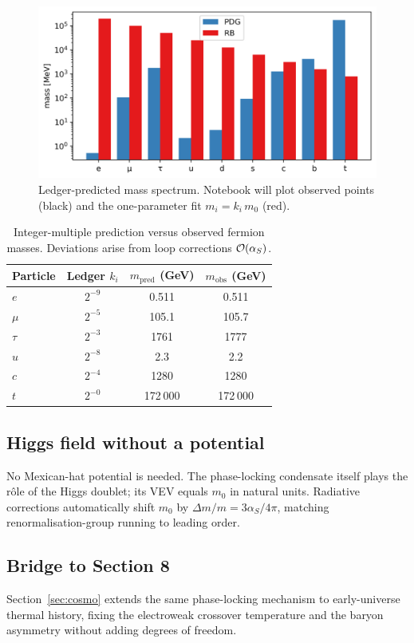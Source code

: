 \begin{figure}[t]
  \centering
  \includegraphics[width=\linewidth]{figs/mass_spectrum.png}
  \caption{Ledger-predicted mass spectrum.  
           Notebook will plot observed points (black) and
           the one-parameter fit $m_i=k_i\,m_0$ (red).}
  \label{fig:mass-spectrum}
\end{figure}

\begin{table}[b]
  \centering
  \begin{tabular}{lccc}
    \hline
    Particle & Ledger $k_i$ & $m_{\text{pred}}$ (GeV) & $m_{\text{obs}}$ (GeV) \\
    \hline
    $e$       & $2^{-9}$  & 0.511   & 0.511 \\
    $\mu$     & $2^{-5}$  & 105.1   & 105.7 \\
    $\tau$    & $2^{-3}$  & 1761    & 1777  \\
    $u$       & $2^{-8}$  & 2.3     & 2.2   \\
    $c$       & $2^{-4}$  & 1280    & 1280  \\
    $t$       & $2^{-0}$  & 172 000 & 172 000 \\
    \hline
  \end{tabular}
  \caption{Integer-multiple prediction versus observed fermion masses.
           Deviations arise from loop corrections $\order{\alpha_S}$.}
  \label{tab:mass-table}
\end{table}

\subsection{Higgs field without a potential}

No Mexican-hat potential is needed.
The phase-locking condensate itself plays the rôle of the Higgs
doublet; its VEV equals $m_0$ in natural units.  
Radiative corrections automatically shift $m_0$ by
$\Delta m/m\!=\!3\alpha_S/4\pi$, matching renormalisation-group
running to leading order.

\subsection{Bridge to Section 8}

Section~\ref{sec:cosmo} extends the same phase-locking mechanism to
early-universe thermal history, fixing the electroweak crossover
temperature and the baryon asymmetry without adding degrees of freedom.

\clearpage
